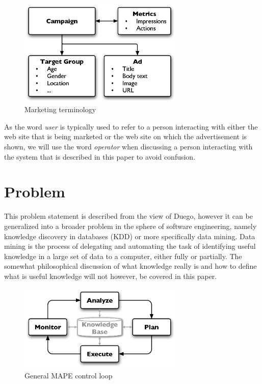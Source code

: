 \documentclass[a4paper]{article}
\begin{document}
\begin{figure}[htb] \centering \includegraphics[width=0.7\textwidth]{campaign-terminology.eps}
	\caption{Marketing terminology}
	\label{fig:MarketingTerminology}
\end{figure}

As the word \emph{user} is typically used to refer to a person interacting with either the web site that is being marketed or the web site on which the advertisement is shown, we will use the word \emph{operator} when discussing a person interacting with the system that is described in this paper to avoid confusion.

\section{Problem}
This problem statement is described from the view of Duego, however it can be generalized into a broader problem in the sphere of software engineering, namely knowledge discovery in databases (KDD) or more specifically data mining. Data mining is the process of delegating and automating the task of identifying useful knowledge in a large set of data to a computer, either fully or  partially. The somewhat philosophical discussion of what knowledge really is and how to define what is useful knowledge will not however, be covered in this paper.

\begin{figure}[htb] \centering \includegraphics[width=0.7\textwidth]{mape.eps}
	\caption{General MAPE control loop}
	\label{fig:MAPE}
\end{figure}
\end{document}
